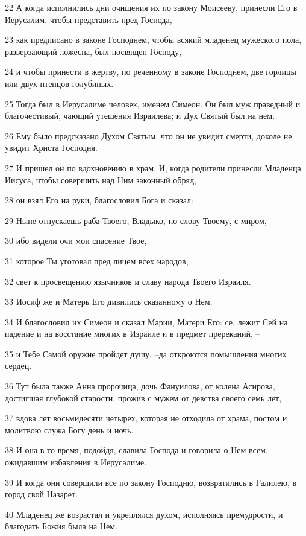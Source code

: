 \par 22 А когда исполнились дни очищения их по закону Моисееву, принесли Его в Иерусалим, чтобы представить пред Господа,
\par 23 как предписано в законе Господнем, чтобы всякий младенец мужеского пола, разверзающий ложесна, был посвящен Господу,
\par 24 и чтобы принести в жертву, по реченному в законе Господнем, две горлицы или двух птенцов голубиных.
\par 25 Тогда был в Иерусалиме человек, именем Симеон. Он был муж праведный и благочестивый, чающий утешения Израилева; и Дух Святый был на нем.
\par 26 Ему было предсказано Духом Святым, что он не увидит смерти, доколе не увидит Христа Господня.
\par 27 И пришел он по вдохновению в храм. И, когда родители принесли Младенца Иисуса, чтобы совершить над Ним законный обряд,
\par 28 он взял Его на руки, благословил Бога и сказал:
\par 29 Ныне отпускаешь раба Твоего, Владыко, по слову Твоему, с миром,
\par 30 ибо видели очи мои спасение Твое,
\par 31 которое Ты уготовал пред лицем всех народов,
\par 32 свет к просвещению язычников и славу народа Твоего Израиля.
\par 33 Иосиф же и Матерь Его дивились сказанному о Нем.
\par 34 И благословил их Симеон и сказал Марии, Матери Его: се, лежит Сей на падение и на восстание многих в Израиле и в предмет пререканий, --
\par 35 и Тебе Самой оружие пройдет душу, --да откроются помышления многих сердец.
\par 36 Тут была также Анна пророчица, дочь Фануилова, от колена Асирова, достигшая глубокой старости, прожив с мужем от девства своего семь лет,
\par 37 вдова лет восьмидесяти четырех, которая не отходила от храма, постом и молитвою служа Богу день и ночь.
\par 38 И она в то время, подойдя, славила Господа и говорила о Нем всем, ожидавшим избавления в Иерусалиме.
\par 39 И когда они совершили все по закону Господню, возвратились в Галилею, в город свой Назарет.
\par 40 Младенец же возрастал и укреплялся духом, исполняясь премудрости, и благодать Божия была на Нем.
